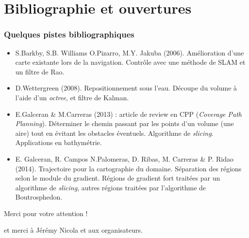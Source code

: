 \documentclass[11pt]{beamer}
\begin{document}
\section{Bibliographie et ouvertures}
\begin{frame}

\frametitle{Quelques pistes bibliographiques}

\begin{itemize}

\item S.Barkby, S.B. Williams O.Pizarro, M.Y. Jakuba
  (2006). Amélioration d'une carte existante lors de la
  navigation. Contrôle avec une méthode de SLAM et un filtre de Rao.

\item D.Wettergreen (2008). Repositionnement sous l'eau. Découpe du
  volume à l'aide d'un \textit{octree}, et filtre de Kalman.

\item E.Galceran \& M.Carreras (2013) : article de review en CPP
  (\textit{Coverage Path Planning}). Déterminer le chemin passant par
  les points d'un volume (une aire) tout en évitant les obstacles
  éventuels. Algorithme de \textit{slicing}. Applications en
  bathymétrie.

\item E. Galceran, R. Campos N.Palomeras, D. Ribas, M. Carreras \&
  P. Ridao (2014). Trajectoire pour la cartographie du
  domaine. Séparation des régions selon le module du gradient. Régions
  de gradient fort traitées par un algorithme de \textit{slicing},
  autres régions traitées par l'algorithme de Boutrosphedon.
\end{itemize}

\end{frame}


\begin{frame}


  \begin{center}
    {\LARGE Merci pour votre attention !}
    
\vspace{2cm}

    et merci à Jérémy Nicola et aux organisateurs.
  \end{center}
\end{frame}
\end{document}
